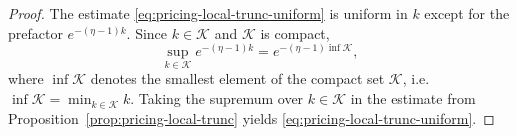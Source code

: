 \documentclass[letterpaper]{article}
\numberwithin{equation}{section}
\theoremstyle{definition}
\theoremstyle{remark}
\begin{document}
\begin{proof}
The estimate \eqref{eq:pricing-local-trunc-uniform} is uniform in $k$ except for the
prefactor $e^{-(\eta-1)k}$. Since $k\in\mathcal K$ and $\mathcal K$ is compact, 
\[
  \sup_{k\in\mathcal K}e^{-(\eta-1)k}
  =
  e^{-(\eta-1)\inf\mathcal K},
\]
where $\inf\mathcal K$ denotes the smallest element of the compact set $\mathcal K$, i.e.\ $\inf\mathcal K=\min_{k\in\mathcal K}k$.
Taking the supremum over $k\in\mathcal K$ in the estimate from
Proposition~\ref{prop:pricing-local-trunc} yields \eqref{eq:pricing-local-trunc-uniform}.
\end{proof}
\end{document}
